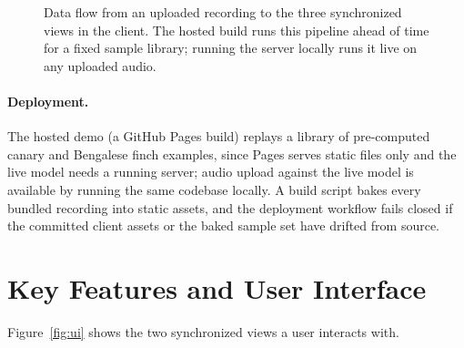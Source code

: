 \documentclass[letterpaper]{article} %
\begin{document}
\begin{figure}[t]
{}
\caption{Data flow from an uploaded recording to the three synchronized
views in the client. The hosted build runs this pipeline ahead of time for
a fixed sample library; running the server locally runs it live on any
uploaded audio.}
\label{fig:architecture}
\end{figure}

\paragraph{Deployment.} The hosted demo (a GitHub Pages build) replays a
library of pre-computed canary and Bengalese finch examples, since Pages
serves static files
only and the live model needs a running server; audio upload against the
live model is available by running the same codebase locally. A build script
bakes every bundled recording into static assets, and the deployment
workflow fails closed if the committed client assets or the baked sample set
have drifted from source.

\section{Key Features and User Interface}
\label{sec:features}
Figure~\ref{fig:ui} shows the two synchronized views a user interacts
with.
\end{document}
